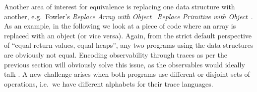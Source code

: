 Another area of interest for equivalence is replacing one data structure with another,
e.g.\ Fowler's \emph{Replace Array with Object}~\cite[p.186]{fowler:refactoring} \emph{Replace Primitive with Object}~\cite{fowler:refactoring2nd}.
As an example, in the following we look at a piece of code where an array is replaced with an object (or vice versa).
Again, from the strict default perspective of ``equal return values, equal heaps'', any two programs using the data structures are obviously not equal.
Encoding observability through traces as per the previous section will obviously solve this issue, as the observables would ideally talk .
A new challenge arises when both programs use different or disjoint sets of operations, i.e.\ we have different alphabets for their trace languages.




